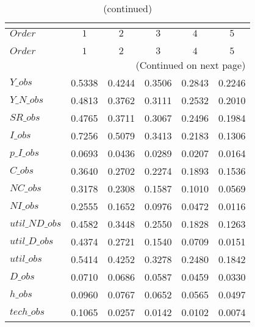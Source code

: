  
\begin{center}
\begin{longtable}{lccccc} 
\caption{COEFFICIENTS OF AUTOCORRELATION}\\
 \label{Table:th_autocorr_matrix}\\
\toprule 
$Order          $	 & 	 $         1$	 & 	 $         2$	 & 	 $         3$	 & 	 $         4$	 & 	 $         5$\\
\midrule \endfirsthead 
\caption{(continued)}\\
 \toprule \\ 
$Order          $	 & 	 $         1$	 & 	 $         2$	 & 	 $         3$	 & 	 $         4$	 & 	 $         5$\\
\midrule \endhead 
\midrule \multicolumn{6}{r}{(Continued on next page)} \\ \bottomrule \endfoot 
\bottomrule \endlastfoot 
$Y\_obs         $	 & 	    0.5338	 & 	    0.4244	 & 	    0.3506	 & 	    0.2843	 & 	    0.2246 \\ 
$Y\_N\_obs      $	 & 	    0.4813	 & 	    0.3762	 & 	    0.3111	 & 	    0.2532	 & 	    0.2010 \\ 
$SR\_obs        $	 & 	    0.4765	 & 	    0.3711	 & 	    0.3067	 & 	    0.2496	 & 	    0.1984 \\ 
$I\_obs         $	 & 	    0.7256	 & 	    0.5079	 & 	    0.3413	 & 	    0.2183	 & 	    0.1306 \\ 
$p\_I\_obs      $	 & 	    0.0693	 & 	    0.0436	 & 	    0.0289	 & 	    0.0207	 & 	    0.0164 \\ 
$C\_obs         $	 & 	    0.3640	 & 	    0.2702	 & 	    0.2274	 & 	    0.1893	 & 	    0.1536 \\ 
$NC\_obs        $	 & 	    0.3178	 & 	    0.2308	 & 	    0.1587	 & 	    0.1010	 & 	    0.0569 \\ 
$NI\_obs        $	 & 	    0.2555	 & 	    0.1652	 & 	    0.0976	 & 	    0.0472	 & 	    0.0116 \\ 
$util\_ND\_obs  $	 & 	    0.4582	 & 	    0.3448	 & 	    0.2550	 & 	    0.1828	 & 	    0.1263 \\ 
$util\_D\_obs   $	 & 	    0.4374	 & 	    0.2721	 & 	    0.1540	 & 	    0.0709	 & 	    0.0151 \\ 
$util\_obs      $	 & 	    0.5414	 & 	    0.4252	 & 	    0.3278	 & 	    0.2480	 & 	    0.1842 \\ 
$D\_obs         $	 & 	    0.0710	 & 	    0.0686	 & 	    0.0587	 & 	    0.0459	 & 	    0.0330 \\ 
$h\_obs         $	 & 	    0.0960	 & 	    0.0767	 & 	    0.0652	 & 	    0.0565	 & 	    0.0497 \\ 
$tech\_obs      $	 & 	    0.1065	 & 	    0.0257	 & 	    0.0142	 & 	    0.0102	 & 	    0.0074 \\ 
\end{longtable}
 \end{center}
